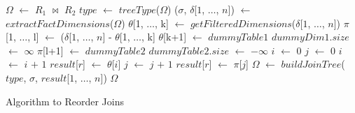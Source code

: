 \begin{algorithm}
\begin{algorithmic}[1]
\STATE  $\Omega$ $\gets$ $R_1$ $\Join$ $R_2$
    \STATE $type$ $\gets$ $treeType$($\Omega$) 
    \STATE ($\sigma$, $\delta$[$1$, $\ldots$, $n$]) $\gets$ $extractFactDimensions$($\Omega$)
    \STATE $\theta$[1, $\ldots$, k] $\gets$ $getFilteredDimensions$($\delta$[$1$, $\ldots$, $n$])
    \STATE $\pi$[1, $\ldots$, l] $\gets$ ($\delta$[$1$, $\ldots$, $n$] - $\theta$[1, $\ldots$, k]
    \STATE $\theta$[k+1] $\gets$ $dummyTable1$
    \STATE $dummyDim1$.$size$ $\gets$ $\infty$ 
    \STATE $\pi$[l+1] $\gets$ $dummyTable2$
    \STATE $dummyTable2$.$size$ $\gets$ $-\infty$
    \STATE $i$ $\gets$ 0
    \STATE $j$ $\gets$ 0
            \STATE $i$ $\gets$ $i$ $+$ $1$
            \STATE $result$[$r$] $\gets$ $\theta$[$i$]
        \ELSE
            \STATE $j$ $\gets$ $j$ $+$ $1$
            \STATE $result$[$r$] $\gets$ $\pi$[$j$]         
        \ENDIF
    \ENDFOR
    \STATE $\Omega$ $\gets$ $buildJoinTree$($type$, $\sigma$, $result$[$1$, $\ldots$, $n$])
\ENDIF
\RETURN $\Omega$ 
\end{algorithmic}
\label{algorithm}
\caption{Algorithm to Reorder Joins}
\end{algorithm}



